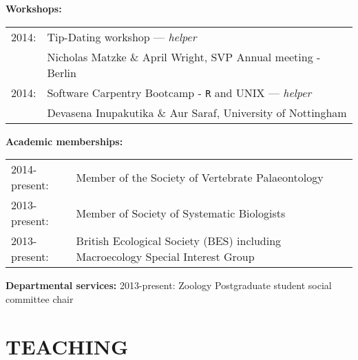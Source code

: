 \documentclass[10pt,a4paper]{article}
\begin{document}
{\raggedright\textbf{Workshops:}

\begin{tabular}{ll}
2014: & Tip-Dating workshop --- \textit{helper}\\
& Nicholas Matzke \& April Wright, SVP Annual meeting - Berlin\\
2014: & Software Carpentry Bootcamp - \texttt{R} and UNIX --- \textit{helper}\\
& Devasena Inupakutika \& Aur Saraf, University of Nottingham\\
\end{tabular}

\bigskip

\raggedright\textbf{Academic memberships:}
\begin{tabular}{ll}
2014-present: & Member of the Society of Vertebrate Palaeontology\\
2013-present: & Member of Society of Systematic Biologists\\
2013-present: & British Ecological Society (BES) including Macroecology Special Interest Group\\
\end{tabular}
\bigskip

\raggedright\textbf{Departmental services:}
2013-present: Zoology Postgraduate student social committee chair
\bigskip


\section{TEACHING}
\bigskip

}
\end{document}
